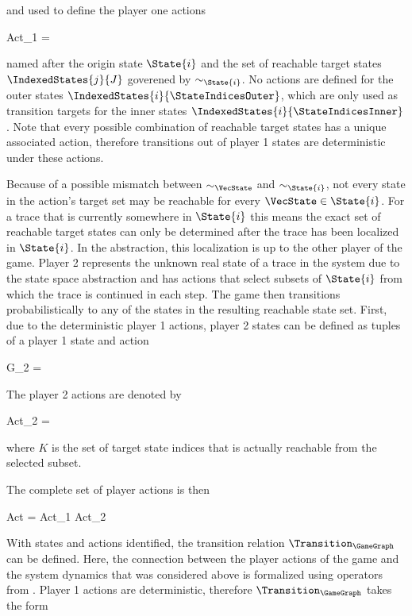 and used to define the player one actions

\startformula
    Act_1 =  \EndComma
\stopformula

named after the origin state $\State{i}$ and the set of reachable target states $\IndexedStates{j}{J}$ goverened by $\sim_{\State{i}}$.
No actions are defined for the outer states $\IndexedStates{i}{\StateIndicesOuter}$, which are only used as transition targets for the inner states $\IndexedStates{i}{\StateIndicesInner}$.
Note that every possible combination of reachable target states has a unique associated action, therefore transitions out of player 1 states are deterministic under these actions.

Because of a possible mismatch between $\sim_\VecState$ and $\sim_{\State{i}}$, not every state in the action's target set may be reachable for every $\VecState \in \State{i}$.
For a trace that is currently somewhere in $\State{i}$ this means the exact set of reachable target states can only be determined after the trace has been localized in $\State{i}$.
In the abstraction, this localization is up to the other player of the game.
Player 2 represents the unknown real state of a trace in the system due to the state space abstraction and has actions that select subsets of $\State{i}$ from which the trace is continued in each step.
The game then transitions probabilistically to any of the states in the resulting reachable state set.
First, due to the deterministic player 1 actions, player 2 states can be defined as tuples of a player 1 state and action

\startformula
    G_2 =  \EndPeriod
\stopformula

The player 2 actions are denoted by

\startformula
    Act_2 =  \EndComma
\stopformula

where $K$ is the set of target state indices that is actually reachable from the selected subset.

The complete set of player actions is then

\startformula
    Act = Act_1 \cup Act_2 \EndPeriod
\stopformula

With states and actions identified, the transition relation $\Transition_\GameGraph$ can be defined.
Here, the connection between the player actions of the game and the system dynamics that was considered above is formalized using operators from .
Player 1 actions are deterministic, therefore $\Transition_\GameGraph$ takes the form

